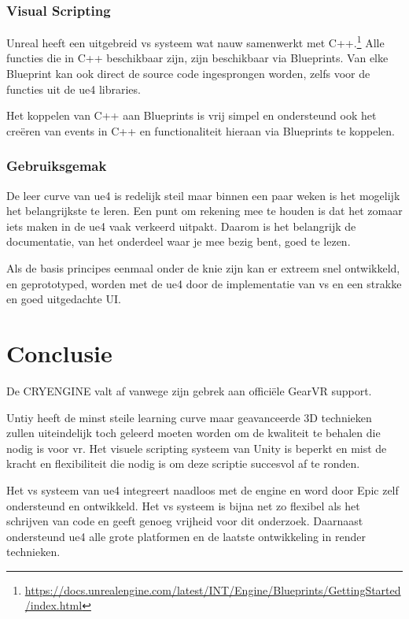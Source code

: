 \subsubsection{Visual Scripting}
Unreal heeft een uitgebreid \gls{vs} systeem wat nauw samenwerkt met C++.\footnote{\url{https://docs.unrealengine.com/latest/INT/Engine/Blueprints/GettingStarted/index.html}} Alle functies die in C++ beschikbaar zijn, zijn beschikbaar via Blueprints. Van elke Blueprint kan ook direct de source code ingesprongen worden, zelfs voor de functies uit de \gls{ue4} libraries.

Het koppelen van C++ aan Blueprints is vrij simpel en ondersteund ook het creëren van events in C++ en functionaliteit hieraan via Blueprints te koppelen.

\subsubsection{Gebruiksgemak}
De leer curve van \gls{ue4} is redelijk steil maar binnen een paar weken is het mogelijk het belangrijkste te leren. Een punt om rekening mee te houden is dat het zomaar iets maken in de \gls{ue4} vaak verkeerd uitpakt. Daarom is het belangrijk de documentatie, van het onderdeel waar je mee bezig bent, goed te lezen.

Als de basis principes eenmaal onder de knie zijn kan er extreem snel ontwikkeld, en geprototyped, worden met de \gls{ue4} door de implementatie van \gls{vs} en een strakke en goed uitgedachte UI.

\section{Conclusie}
De CRYENGINE valt af vanwege zijn gebrek aan officiële GearVR support. 

Untiy heeft de minst steile learning curve maar geavanceerde 3D technieken zullen uiteindelijk toch geleerd moeten worden om de kwaliteit te behalen die nodig is voor \gls{vr}. Het visuele scripting systeem van Unity is beperkt en mist de kracht en flexibiliteit die nodig is om deze scriptie succesvol af te ronden.

Het \gls{vs} systeem van \gls{ue4} integreert naadloos met de engine en word door Epic zelf ondersteund en ontwikkeld. Het \gls{vs} systeem is bijna net zo flexibel als het schrijven van code en geeft genoeg vrijheid voor dit onderzoek. Daarnaast ondersteund \gls{ue4} alle grote platformen en de laatste ontwikkeling in render technieken.